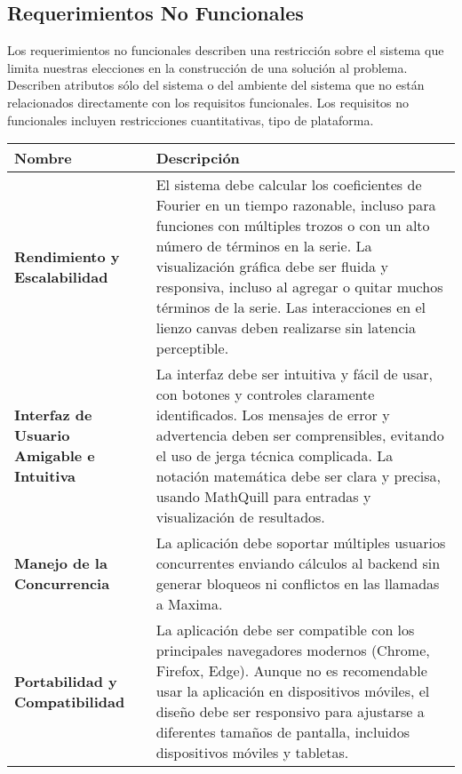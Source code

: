 \subsection{Requerimientos No Funcionales}
Los requerimientos no funcionales describen una restricción sobre el sistema que limita nuestras elecciones en la construcción de una solución al problema. Describen atributos sólo del sistema o del ambiente del sistema que no están relacionados directamente con los requisitos funcionales. Los requisitos no funcionales incluyen restricciones cuantitativas, tipo de plataforma.

\begin{longtable}{|m{5cm}|m{10cm}|}
	\hline
	\rowcolor{black!75} \color{white}\textbf{Nombre} & \color{white}\textbf{Descripción} \\
	\hline
	\textbf{Rendimiento y Escalabilidad} & El sistema debe calcular los coeficientes de Fourier en un tiempo razonable, incluso para funciones con múltiples trozos o con un alto número de términos en la serie. La visualización gráfica debe ser fluida y responsiva, incluso al agregar o quitar muchos términos de la serie. Las interacciones en el lienzo canvas deben realizarse sin latencia perceptible. \\
	\hline
	\textbf{Interfaz de Usuario Amigable e Intuitiva} & La interfaz debe ser intuitiva y fácil de usar, con botones y controles claramente identificados. Los mensajes de error y advertencia deben ser comprensibles, evitando el uso de jerga técnica complicada. La notación matemática debe ser clara y precisa, usando MathQuill para entradas y visualización de resultados. \\
	\hline
	\textbf{Manejo de la Concurrencia} & La aplicación debe soportar múltiples usuarios concurrentes enviando cálculos al backend sin generar bloqueos ni conflictos en las llamadas a Maxima. \\
	\hline
	\textbf{Portabilidad y Compatibilidad} & La aplicación debe ser compatible con los principales navegadores modernos (Chrome, Firefox, Edge). Aunque no es recomendable usar la aplicación en dispositivos móviles, el diseño debe ser responsivo para ajustarse a diferentes tamaños de pantalla, incluidos dispositivos móviles y tabletas. \\

\end{longtable}
